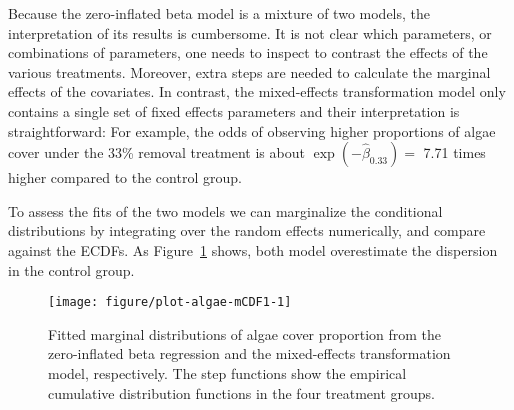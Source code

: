 \documentclass[11pt]{article}\usepackage[]{graphicx}\usepackage{xcolor}
\newenvironment{knitrout}{}{} %
\newcommand{\0}{{\mathbf{0}}}
\begin{document}
Because the zero-inflated beta model is a mixture of two models,
the interpretation of its results is cumbersome.
It is not clear which parameters,
or combinations of parameters,
one needs to inspect to contrast
the effects of the various treatments.
Moreover, extra steps are needed to calculate the marginal effects
of the covariates.
In contrast,
the mixed-effects transformation model
only contains a single set of fixed effects parameters
and their interpretation is straightforward:
For example,
the odds of observing higher proportions of algae cover
under the 33\% removal treatment is about
$\exp(-\widehat{\beta}_{0.33}) = $
7.71
times higher compared to the control group.

To assess the fits of the two models we can marginalize
the conditional distributions by integrating over the random effects numerically,
and compare against the ECDFs.
As Figure~\ref{fig:algae-mcdf1} shows, both model overestimate the dispersion
in the control group.



\begin{figure}[!ht]
\centering

\begin{knitrout}\small
{}\color{fgcolor}
\texttt{[image: figure/plot-algae-mCDF1-1]} 
\end{knitrout}

\caption{Fitted marginal distributions of algae cover proportion from
  the zero-inflated beta regression and the mixed-effects
  transformation model, respectively.
  The step functions show the empirical cumulative distribution
  functions in the four treatment groups.}\label{fig:algae-mcdf1}
\end{figure}
\end{document}
